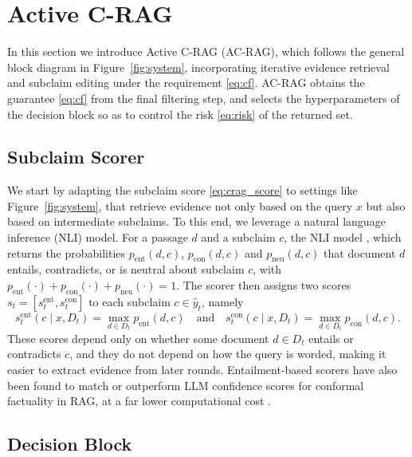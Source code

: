 \section{Active C-RAG}\label{sec:approach}

In this section we introduce Active C-RAG (AC-RAG), which follows the general block diagram in Figure~\ref{fig:system}, incorporating iterative evidence retrieval and subclaim editing under the requirement \eqref{eq:cf}. AC-RAG obtains the guarantee \eqref{eq:cf} from the final filtering step, and selects the hyperparameters of the decision block so as to control the risk \eqref{eq:risk} of the returned set.

\subsection{Subclaim Scorer}\label{subsec:scorer}

We start by adapting the subclaim score \eqref{eq:crag_score} to settings like Figure~\ref{fig:system}, that retrieve evidence not only based on the query $x$ but also based on intermediate subclaims. To this end, we leverage a natural language inference (NLI) model. For a passage $d$ and a subclaim $c$, the NLI model , which returns the probabilities $p_{\mathrm{ent}}(d, c)$, $p_{\mathrm{con}}(d, c)$ and $p_{\mathrm{neu}}(d, c)$ that document $d$ entails, contradicts, or is neutral about subclaim $c$, with $p_{\mathrm{ent}}(\cdot) + p_{\mathrm{con}}(\cdot) + p_{\mathrm{neu}}(\cdot) = 1$. The scorer then assigns two scores $s_t = [s^{\mathrm{ent}}_{t}, s^{\mathrm{con}}_{t}]$ to each subclaim $c \in \hat{y}_t$, namely
\begin{equation}
  s^{\mathrm{ent}}_t(c \mid x, D_t) = \max_{d \in D_t} p_{\mathrm{ent}}(d, c) \quad \text{and} \quad s^{\mathrm{con}}_t(c \mid x, D_t) = \max_{d \in D_t} p_{\mathrm{con}}(d, c).
  \label{eq:nli_score}
\end{equation}
These scores depend only on whether some document $d \in D_t$ entails or contradicts $c$, and they do not depend on how the query is worded, making it easier to extract evidence from later rounds. Entailment-based scorers have also been found to match or outperform LLM confidence scores for conformal factuality in RAG, at a far lower computational cost \cite{chen2026conformal}.

\subsection{Decision Block}\label{subsec:decision}

